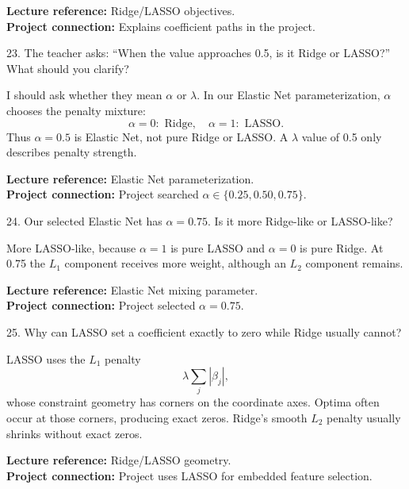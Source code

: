 \documentclass[10.5pt,a4paper]{article}
\newcommand{\chapref}[1]{\textbf{Lecture reference:} #1}
\newcommand{\projectref}[1]{\textbf{Project connection:} #1}
\begin{document}
\begin{refbox}\chapref{Ridge/LASSO objectives.}\\\projectref{Explains coefficient paths in the project.}\end{refbox}
\begin{qbox}{23. The teacher asks: ``When the value approaches 0.5, is it Ridge or LASSO?'' What should you clarify?}
\end{qbox}
\begin{answerbox}I should ask whether they mean \(\alpha\) or \(\lambda\). In our Elastic Net parameterization, \(\alpha\) chooses the penalty mixture:
\[
\alpha=0:\text{ Ridge},\quad \alpha=1:\text{ LASSO}.
\]
Thus \(\alpha=0.5\) is Elastic Net, not pure Ridge or LASSO. A \(\lambda\) value of 0.5 only describes penalty strength.\end{answerbox}
\begin{refbox}\chapref{Elastic Net parameterization.}\\\projectref{Project searched $\alpha\in\{0.25,0.50,0.75\}$.}\end{refbox}
\begin{qbox}{24. Our selected Elastic Net has $\alpha=0.75$. Is it more Ridge-like or LASSO-like?}
\end{qbox}
\begin{answerbox}More LASSO-like, because \(\alpha=1\) is pure LASSO and \(\alpha=0\) is pure Ridge. At 0.75 the \(L_1\) component receives more weight, although an \(L_2\) component remains.\end{answerbox}
\begin{refbox}\chapref{Elastic Net mixing parameter.}\\\projectref{Project selected $\alpha=0.75$.}\end{refbox}
\begin{qbox}{25. Why can LASSO set a coefficient exactly to zero while Ridge usually cannot?}
\end{qbox}
\begin{answerbox}LASSO uses the \(L_1\) penalty
\[
\lambda\sum_j|\beta_j|,
\]
whose constraint geometry has corners on the coordinate axes. Optima often occur at those corners, producing exact zeros. Ridge's smooth \(L_2\) penalty usually shrinks without exact zeros.\end{answerbox}
\begin{refbox}\chapref{Ridge/LASSO geometry.}\\\projectref{Project uses LASSO for embedded feature selection.}\end{refbox}
\end{document}
